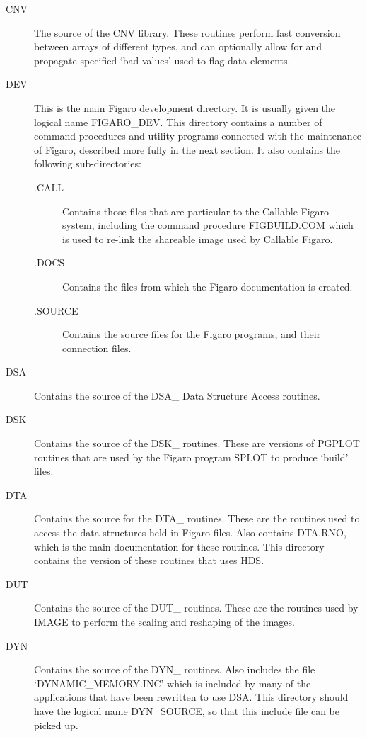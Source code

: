 \begin{description}

\item [CNV] The source of the CNV library. These routines perform fast
conversion between arrays of different types, and can optionally allow for and
propagate specified `bad values' used to flag data elements.

\item [DEV] This is the main Figaro development directory. It is usually given
the logical name FIGARO\_DEV. This directory contains a number of command
procedures and utility programs connected with the maintenance of Figaro,
described more fully in the next section. It also contains the following
sub-directories:

\begin{description}

\item [.CALL] Contains those files that are particular to the Callable Figaro
system, including the command procedure FIGBUILD.COM which is used to re-link
the shareable image used by Callable Figaro.

\item [.DOCS] Contains the files from which the Figaro documentation is
created.

\item [.SOURCE] Contains the source files for the Figaro programs, and their
connection files.

\end{description}

\item [DSA] Contains the source of the DSA\_ Data Structure Access routines.

\item [DSK] Contains the source of the DSK\_ routines. These are versions of
PGPLOT routines that are used by the Figaro program SPLOT to produce `build'
files.

\item [DTA] Contains the source for the DTA\_ routines. These are the
routines used to access the data structures held in Figaro files. Also
contains DTA.RNO, which is the main documentation for these routines. This
directory contains the version of these routines that uses HDS.

\item [DUT] Contains the source of the DUT\_ routines. These are the
routines used by IMAGE to perform the scaling and reshaping of the images.

\item [DYN] Contains the source of the DYN\_ routines. Also includes the
file `DYNAMIC\_MEMORY\-.INC' which is included by many of the applications
that have been rewritten to use DSA. This directory should have the
logical name DYN\_SOURCE, so that this include file can be picked up.


\end{description}
